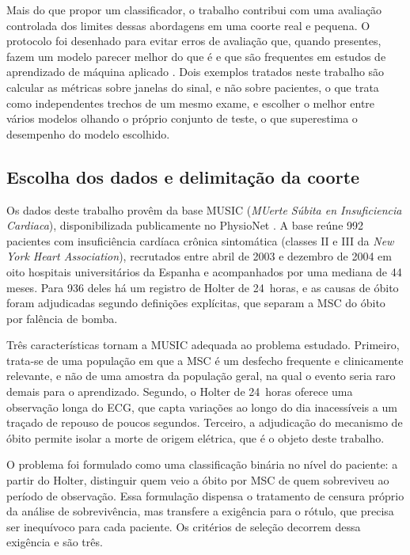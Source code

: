 Mais do que propor um classificador, o trabalho contribui com uma avaliação
controlada dos limites dessas abordagens em uma coorte real e pequena. O
protocolo foi desenhado para evitar erros de avaliação que, quando presentes,
fazem um modelo parecer melhor do que é e que são frequentes em estudos de
aprendizado de máquina aplicado \cite{kapoor2023leakage}. Dois exemplos
tratados neste trabalho são calcular as métricas sobre janelas do sinal, e
não sobre pacientes, o que trata como independentes trechos de um mesmo
exame, e escolher o melhor entre vários modelos olhando o próprio conjunto
de teste, o que superestima o desempenho do modelo escolhido.

\subsection{Escolha dos dados e delimitação da coorte}
\label{sec:intro-dados}

Os dados deste trabalho provêm da base MUSIC (\textit{MUerte Súbita en
    Insuficiencia Cardiaca}), disponibilizada publicamente no PhysioNet
\cite{martinyebra2025music, martinyebra2024music}. A base reúne 992 pacientes
com insuficiência cardíaca crônica sintomática (classes II e III da
\textit{New York Heart Association}), recrutados entre abril de 2003 e
dezembro de 2004 em oito hospitais universitários da Espanha e acompanhados
por uma mediana de 44 meses. Para 936 deles há um registro de Holter de
24~horas, e as causas de óbito foram adjudicadas segundo definições
explícitas, que separam a \gls{MSC} do óbito por falência de bomba.

Três características tornam a MUSIC adequada ao problema estudado. Primeiro,
trata-se de uma população em que a \gls{MSC} é um desfecho frequente e
clinicamente relevante, e não de uma amostra da população geral, na qual o
evento seria raro demais para o aprendizado. Segundo, o Holter de 24~horas
oferece uma observação longa do \gls{ECG}, que capta variações ao longo do
dia inacessíveis a um traçado de repouso de poucos segundos. Terceiro, a
adjudicação do mecanismo de óbito permite isolar a morte de origem elétrica,
que é o objeto deste trabalho.

O problema foi formulado como uma classificação binária no nível do
paciente: a partir do Holter, distinguir quem veio a óbito por \gls{MSC}
de quem sobreviveu ao período de observação. Essa formulação dispensa o
tratamento de censura próprio da análise de sobrevivência, mas transfere a
exigência para o rótulo, que precisa ser inequívoco para cada paciente. Os
critérios de seleção decorrem dessa exigência e são três.

